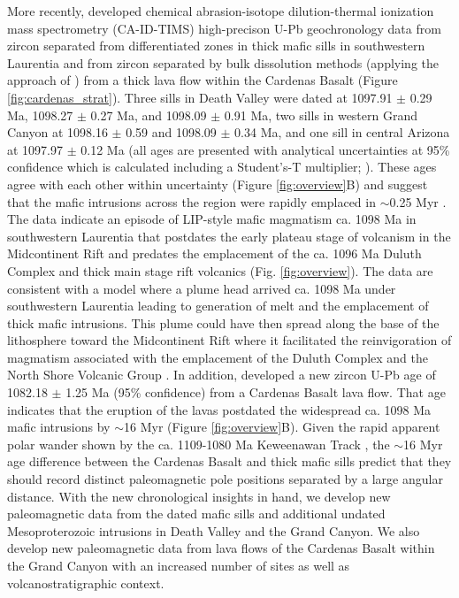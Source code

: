 More recently, \cite{Mohr2024a} developed chemical abrasion-isotope dilution-thermal ionization mass spectrometry (CA-ID-TIMS) high-precison U-Pb geochronology data from zircon separated from differentiated zones in thick mafic sills in southwestern Laurentia and from zircon separated by bulk dissolution methods (applying the approach of \cite{Oliveira2022a}) from a thick lava flow within the Cardenas Basalt (Figure \ref{fig:cardenas_strat}). Three sills in Death Valley were dated at 1097.91 $\pm$ 0.29 Ma, 1098.27 $\pm$ 0.27 Ma, and 1098.09 $\pm$ 0.91 Ma, two sills in western Grand Canyon at 1098.16 $\pm$ 0.59 and 1098.09 $\pm$ 0.34 Ma, and one sill in central Arizona at 1097.97 $\pm$ 0.12 Ma (all ages are presented with analytical uncertainties at 95\% confidence which is calculated including a Student’s-T multiplier; \cite{Mohr2024a}). These ages agree with each other within uncertainty (Figure \ref{fig:overview}B) and suggest that the mafic intrusions across the region were rapidly emplaced in $\sim$0.25 Myr \citep{Mohr2024a}. The data indicate an episode of LIP-style mafic magmatism ca. 1098 Ma in southwestern Laurentia that postdates the early plateau stage of volcanism in the Midcontinent Rift and predates the emplacement of the ca. 1096 Ma Duluth Complex and thick main stage rift volcanics (Fig. \ref{fig:overview}). The data are consistent with a model where a plume head arrived ca. 1098 Ma under southwestern Laurentia leading to generation of melt and the emplacement of thick mafic intrusions. This plume could have then spread along the base of the lithosphere toward the Midcontinent Rift where it facilitated the reinvigoration of magmatism associated with the emplacement of the Duluth Complex and the North Shore Volcanic Group \citep{Mohr2024a}. In addition, \cite{Mohr2024a} developed a new zircon U-Pb age of 1082.18 $\pm$ 1.25 Ma (95\% confidence) from a Cardenas Basalt lava flow. That age indicates that the eruption of the lavas postdated the widespread ca. 1098 Ma mafic intrusions by $\sim$16 Myr (Figure \ref{fig:overview}B). Given the rapid apparent polar wander shown by the ca. 1109-1080 Ma Keweenawan Track \citep{Swanson-Hysell2019a}, the $\sim$16 Myr age difference between the Cardenas Basalt and thick mafic sills predict that they should record distinct paleomagnetic pole positions separated by a large angular distance. With the new chronological insights in hand, we develop new paleomagnetic data from the dated mafic sills and additional undated Mesoproterozoic intrusions in Death Valley and the Grand Canyon. We also develop new paleomagnetic data from lava flows of the Cardenas Basalt within the Grand Canyon with an increased number of sites as well as volcanostratigraphic context. 

